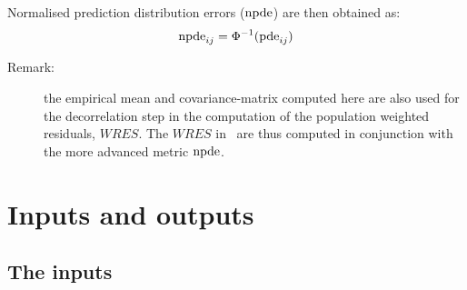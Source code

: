 Normalised prediction distribution errors (${\rm npde}$) are then obtained as:
\begin{equation}
{\rm npde}_{ij} = \Phi^{-1} ({\rm pde}_{ij})
\end{equation}

\begin{description}
\item[Remark:] the empirical mean and covariance-matrix computed here are also used for the decorrelation step in the computation of the population weighted residuals, $WRES$. The $WRES$ in \monolix ~are thus computed in conjunction with the more advanced metric ${\rm npde}$.
\end{description}


\section{Inputs and outputs} \label{sec:methodsinpout}

\subsection{The inputs}

